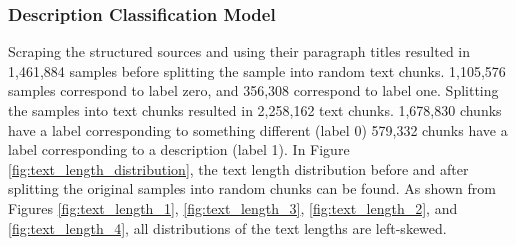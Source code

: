 \documentclass[a4paper, 12pt, oneside]{book} %
\begin{document}
\subsubsection{Description Classification Model} \label{par:results_binary_classifier}
Scraping the structured sources and using their paragraph titles resulted in 1,461,884 samples before splitting the sample into random text chunks.
1,105,576 samples correspond to label zero, and 356,308 correspond to label one.
Splitting the samples into text chunks resulted in 2,258,162 text chunks.
1,678,830 chunks have a label corresponding to something different (label 0) 579,332 chunks have a label corresponding to a description (label 1).
In Figure \ref{fig:text_length_distribution}, the text length distribution before and after splitting the original samples into random chunks can be found.
As shown from Figures \ref{fig:text_length_1}, \ref{fig:text_length_3}, \ref{fig:text_length_2}, and \ref{fig:text_length_4}, all distributions of the text lengths are left-skewed. 
\end{document}
